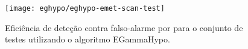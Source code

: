 \begin{figure}
\begin{center}
\texttt{[image: eghypo/eghypo-emet-scan-test]}
\end{center}
\caption{Eficiência de deteção contra falso-alarme por \etem para o conjunto
de testes utilizando o algoritmo EGammaHypo.}
\label{fig:eghypo-emet-scan-test}
\end{figure}






